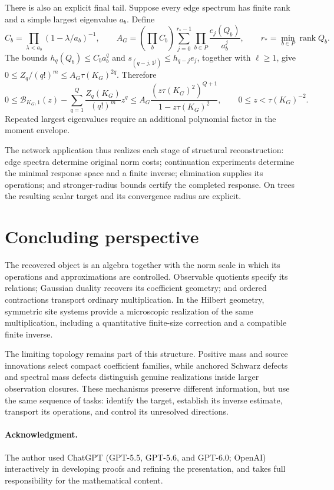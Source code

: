 \documentclass[11pt,a4paper]{amsart}
\numberwithin{equation}{section}
\theoremstyle{definition}
\theoremstyle{remark}
\DeclareMathOperator{\rank}{rank}
\begin{document}
There is also an explicit final tail. Suppose every edge spectrum has finite rank and a simple largest eigenvalue $a_b$. Define
\[
 C_b=\prod_{\lambda<a_b}(1-\lambda/a_b)^{-1},\qquad
 A_G=\left(\prod_bC_b\right)
       \sum_{j=0}^{r_*-1}\prod_{b\in P}\frac{e_j(Q_b)}{a_b^j},
 \qquad r_* =\min_{b\in P}\rank Q_b.
\]
The bounds $h_q(Q_b)\le C_ba_b^q$ and $s_{(q-j,1^j)}\le h_{q-j}e_j$, together with $\ell\ge1$, give
$0\le Z_q/(q!)^m\le A_G\tau(K_G)^{2q}$.
Therefore
\begin{equation}\label{eq:physical_tree_tail}
 0\le\mathcal B_{K_G,1}(z)-\sum_{q=1}^Q\frac{Z_q(K_G)}{(q!)^m}z^q
 \le A_G\frac{(z\tau(K_G)^2)^{Q+1}}{1-z\tau(K_G)^2},
 \qquad0\le z<\tau(K_G)^{-2}.
\end{equation}
Repeated largest eigenvalues require an additional polynomial factor in the moment envelope.

The network application thus realizes each stage of structural reconstruction: edge spectra determine original norm costs; continuation experiments determine the minimal response space and a finite inverse; elimination supplies its operations; and stronger-radius bounds certify the completed response. On trees the resulting scalar target and its convergence radius are explicit.

\section*{Concluding perspective}
The recovered object is an algebra together with the norm scale in which its operations and approximations are controlled. Observable quotients specify its relations; Gaussian duality recovers its coefficient geometry; and ordered contractions transport ordinary multiplication. In the Hilbert geometry, symmetric site systems provide a microscopic realization of the same multiplication, including a quantitative finite-size correction and a compatible finite inverse.

The limiting topology remains part of this structure. Positive mass and source innovations select compact coefficient families, while anchored Schwarz defects and spectral mass defects distinguish genuine realizations inside larger observation closures. These mechanisms preserve different information, but use the same sequence of tasks: identify the target, establish its inverse estimate, transport its operations, and control its unresolved directions.

\paragraph{Acknowledgment.}
The author used ChatGPT (GPT-5.5, GPT-5.6, and GPT-6.0; OpenAI) interactively in developing proofs and refining the presentation, and takes full responsibility for the mathematical content.
\end{document}
